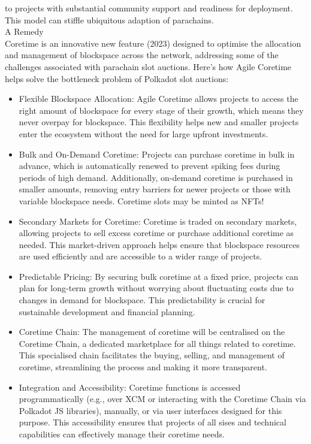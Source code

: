 \documentclass{tufte-handout}
\begin{document}
to projects with substantial community support and readiness for deployment. This model can stiffle ubiquitous adaption of parachains. \\
\vspace{10pt}
A Remedy \\
\vspace{10pt}
Coretime is an innovative new feature (2023) designed to optimise the allocation and management of blockspace across the
network, addressing some of the challenges associated with parachain slot auctions. Here's how Agile Coretime helps solve the bottleneck
problem of Polkadot slot auctions:
\begin{itemize}
  \item Flexible Blockspace Allocation: Agile Coretime allows projects to access the right amount of blockspace for every stage of their
  growth, which means they never overpay for blockspace. This flexibility helps new and smaller projects enter the ecosystem without the
  need for large upfront investments.
  \item Bulk and On-Demand Coretime: Projects can purchase coretime in bulk in advance, which is automatically renewed to prevent
  spiking fees during periods of high demand. Additionally, on-demand coretime is purchased in smaller amounts, removing entry barriers
  for newer projects or those with variable blockspace needs. Coretime slots may be minted as NFTs!
  \item Secondary Markets for Coretime: Coretime is traded on secondary markets, allowing projects to sell excess coretime or purchase
  additional coretime as needed. This market-driven approach helps ensure that blockspace resources are used efficiently and are accessible
  to a wider range of projects.
  \item Predictable Pricing: By securing bulk coretime at a fixed price, projects can plan for long-term growth without worrying about
  fluctuating costs due to changes in demand for blockspace. This predictability is crucial for sustainable development and financial
  planning.
  \item Coretime Chain: The management of coretime will be centralised on the Coretime Chain, a dedicated marketplace for all things
  related to coretime. This specialised chain facilitates the buying, selling, and management of coretime, streamlining the process and
  making it more transparent.
  \item Integration and Accessibility: Coretime functions is accessed programmatically (e.g., over XCM or interacting with the Coretime
  Chain via Polkadot JS libraries), manually, or via user interfaces designed for this purpose. This accessibility ensures that projects of
  all sises and technical capabilities can effectively manage their coretime needs.
\end{itemize}
\end{document}

